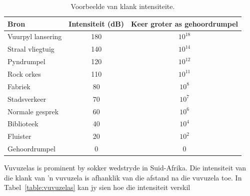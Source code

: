 \begin{table}[H]
\begin{center}
\begin{tabular}{|l|c|c|}\hline
\textbf{Bron}&\textbf{Intensiteit} (dB) & \textbf{Keer groter as gehoordrumpel}\\\hline
Vuurpyl lansering &180 & $10^{18}$\\
Straal vliegtuig & 140 & $10^{14}$ \\
Pyndrumpel & 120 & $10^{12}$\\
Rock orkes & 110 & $10^{11}$\\
Fabriek & 80 & $10^{8}$\\
Stadsverkeer & 70 & $10^{7}$\\
Normale gesprek & 60 & $10^{6}$\\
Biblioteek & 40 & $10^{4}$\\
Fluister & 20 & $10^{2}$\\
Gehoordrumpel & 0 & 0\\
\hline
\end{tabular}
\end{center}
\caption{Voorbeelde van klank intensiteite.}
\label{p:wsl:s11:intensity}
\end{table}

Vuvuzelas is prominent by sokker wedstryde in Suid-Afrika. Die intensiteit van die klank van 'n vuvuzela is afhanklik van die afstand na die vuvuzela toe. In Tabel~\ref{table:vuvuzelas} kan jy sien hoe die intensiteit verskil


